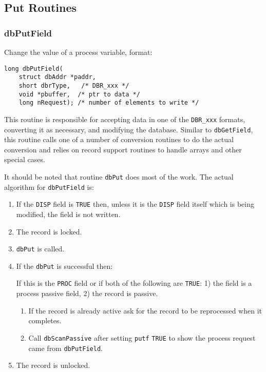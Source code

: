 \subsection{Put Routines}

\subsubsection{dbPutField}

Change the value of a process variable, format:

\begin{verbatim}long dbPutField(
    struct dbAddr *paddr,
    short dbrType,   /* DBR_xxx */
    void *pbuffer,  /* ptr to data */
    long nRequest); /* number of elements to write */
\end{verbatim}This routine is responsible for accepting data in one of the \verb|DBR_xxx| formats, converting it as necessary, and modifying 
the database. Similar to \verb|dbGetField|, this routine calls one of a number of conversion routines to do the actual 
conversion and relies on record support routines to handle arrays and other special cases.

It should be noted that routine \verb|dbPut| does most of the work. The actual algorithm for \verb|dbPutField| is:

\begin{enumerate}\item If the \verb|DISP| field is \verb|TRUE| then, unless it is the \verb|DISP| field itself which is being modified, the field is not written.

\item The record is locked.

\item \verb|dbPut| is called.

\item If the \verb|dbPut| is successful then:

If this is the \verb|PROC| field or if both of the following are \verb|TRUE|: 1) the field is a process passive field, 2) the record is 
passive.

\begin{enumerate}

\item If the record is already active ask for the record to be reprocessed when it completes.

\item Call \verb|dbScanPassive| after setting \verb|putf| \verb|TRUE| to show the process request came from \verb|dbPutField|.

\end{enumerate}

\item The record is unlocked.

\end{enumerate}

